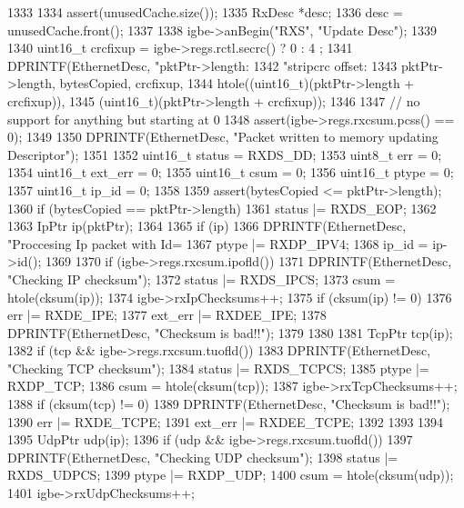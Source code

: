 \begin{DoxyCode}
1333 {
1334     assert(unusedCache.size());
1335     RxDesc *desc;
1336     desc = unusedCache.front();
1337 
1338     igbe->anBegin("RXS", "Update Desc");
1339 
1340     uint16_t crcfixup = igbe->regs.rctl.secrc() ? 0 : 4 ;
1341     DPRINTF(EthernetDesc, "pktPtr->length: %
1342             "stripcrc offset: %
1343             pktPtr->length, bytesCopied, crcfixup,
1344             htole((uint16_t)(pktPtr->length + crcfixup)),
1345             (uint16_t)(pktPtr->length + crcfixup));
1346 
1347     // no support for anything but starting at 0
1348     assert(igbe->regs.rxcsum.pcss() == 0);
1349 
1350     DPRINTF(EthernetDesc, "Packet written to memory updating Descriptor\n");
1351 
1352     uint16_t status = RXDS_DD;
1353     uint8_t err = 0;
1354     uint16_t ext_err = 0;
1355     uint16_t csum = 0;
1356     uint16_t ptype = 0;
1357     uint16_t ip_id = 0;
1358 
1359     assert(bytesCopied <= pktPtr->length);
1360     if (bytesCopied == pktPtr->length)
1361         status |= RXDS_EOP;
1362 
1363     IpPtr ip(pktPtr);
1364 
1365     if (ip) {
1366         DPRINTF(EthernetDesc, "Proccesing Ip packet with Id=%
1367         ptype |= RXDP_IPV4;
1368         ip_id = ip->id();
1369 
1370         if (igbe->regs.rxcsum.ipofld()) {
1371             DPRINTF(EthernetDesc, "Checking IP checksum\n");
1372             status |= RXDS_IPCS;
1373             csum = htole(cksum(ip));
1374             igbe->rxIpChecksums++;
1375             if (cksum(ip) != 0) {
1376                 err |= RXDE_IPE;
1377                 ext_err |= RXDEE_IPE;
1378                 DPRINTF(EthernetDesc, "Checksum is bad!!\n");
1379             }
1380         }
1381         TcpPtr tcp(ip);
1382         if (tcp && igbe->regs.rxcsum.tuofld()) {
1383             DPRINTF(EthernetDesc, "Checking TCP checksum\n");
1384             status |= RXDS_TCPCS;
1385             ptype |= RXDP_TCP;
1386             csum = htole(cksum(tcp));
1387             igbe->rxTcpChecksums++;
1388             if (cksum(tcp) != 0) {
1389                 DPRINTF(EthernetDesc, "Checksum is bad!!\n");
1390                 err |= RXDE_TCPE;
1391                 ext_err |= RXDEE_TCPE;
1392             }
1393         }
1394 
1395         UdpPtr udp(ip);
1396         if (udp && igbe->regs.rxcsum.tuofld()) {
1397             DPRINTF(EthernetDesc, "Checking UDP checksum\n");
1398             status |= RXDS_UDPCS;
1399             ptype |= RXDP_UDP;
1400             csum = htole(cksum(udp));
1401             igbe->rxUdpChecksums++;
}}}
\end{DoxyCode}
